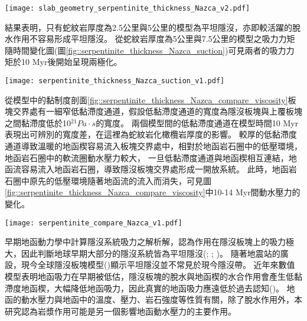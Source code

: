 \begin{figure*}[h]
    \centering
    \texttt{[image: slab\_geometry\_serpentinite\_thickness\_Nazca\_v2.pdf]}
    \caption[不同蛇紋岩厚度的模型的隱沒板塊頂部剖面圖]{不同蛇紋岩厚度的模型的隱沒板塊頂部剖面圖。}
    \label{fig::slab_geometry_serpentinite_thickness_Nazca_top}
\end{figure*}

結果表明，只有蛇紋岩厚度為2.5公里與5公里的模型為平坦隱沒，亦即較活躍的脫水作用不容易形成平坦隱沒。
從蛇紋岩厚度為5公里與7.5公里的模型之吸力力矩隨時間變化圖(圖\ref{fig::serpentinite_thickness_Nazca_suction})可見兩者的吸力力矩於10 Myr後開始呈現兩極化。

\begin{figure*}[h]
    \centering
    \texttt{[image: serpentinite\_thickness\_Nazca\_suction\_v1.pdf]}
    \caption[不同蛇紋岩厚度的模型之吸力力矩]{不同蛇紋岩厚度的模型之吸力力矩。}
    \label{fig::serpentinite_thickness_Nazca_suction}
\end{figure*}
從模型中的黏制度剖面\ref{fig::serpentinite_thickness_Nazca_compare_viscosity}板塊交界處有一細窄低黏滯度通道，假設低黏滯度通道的寬度為隱沒板塊與上覆板塊之間黏滯度低於10$^{21} Pa\cdot s$的寬度。
兩個模型間的低黏滯度通道在模型時間10 Myr表現出可辨別的寬度差，在這裡為蛇紋岩化橄欖岩厚度的影響。
較厚的低黏滯度通道導致溫暖的地函楔容易流入板塊交界處中，相對於地函岩石圈中的低壓環境，地函岩石圈中的軟流圈動水壓力較大，
一旦低黏滯度通道與地函楔相互連結，地函流容易流入地函岩石圈，導致隱沒板塊交界處形成一開放系統。
此時，地函岩石圈中原先的低壓環境隨著地函流的流入而消失，可見圖\ref{fig::serpentinite_thickness_Nazca_compare_viscosity}中10-14 Myr間動水壓力的變化。

\begin{figure*}[hp]
    \centering
    \texttt{[image: serpentinite\_compare\_Nazca\_v1.pdf]}
    \caption[]{}
    \label{fig::serpentinite_thickness_Nazca_compare_viscosity}
\end{figure*}

早期地函動力學中計算隱沒系統吸力之解析解，認為作用在隱沒板塊上的吸力極大，因此判斷地球早期大部分的隱沒系統皆為平坦隱沒(\citealp{tovish1978mantle}; \citealp{vlaar1983thermal}; \citealp{abbott1994flat})。
隨著地震站的廣設，現今全球隱沒板塊模型(\citealp{hayes2018slab2})顯示平坦隱沒並不常見於現今隱沒帶。
近年來數值模型表明地函吸力在早期被低估，隱沒板塊的脫水與地函楔的水合作用會產生低黏滯度地函楔，大幅降低地函吸力，因此真實的地函吸力應遠低於過去認知(\citealp{Manea2007})。
地函的動水壓力與地函中的溫度、壓力、岩石強度等性質有關，除了脫水作用外，本研究認為岩漿作用可能是另一個影響地函動水壓力的主要作用。

